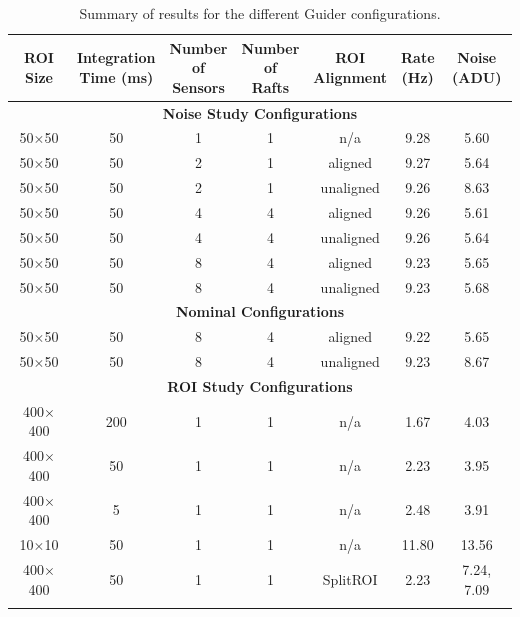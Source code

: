 \begin{longtable}[th]{|c|c|c|c|c|c|c|}
\caption{Summary of results for the different Guider configurations.}\\
\hline
\makecell{\textbf{ROI} \\ \textbf{Size}} &
\makecell{\textbf{Integration} \\ \textbf{Time (ms)}} &
\makecell{\textbf{Number} \\ \textbf{of} \\ \textbf{Sensors}} &
\makecell{\textbf{Number} \\ \textbf{of} \\ \textbf{Rafts}} &
\makecell{\textbf{ROI} \\ \textbf{Alignment}} &
\makecell{\textbf{Rate} \\ \textbf{(Hz)}} &
\makecell{\textbf{Noise} \\ \textbf{(ADU)}} \\
\hline
\hline
\endhead
\multicolumn{7}{|c|}{\textbf{Noise Study Configurations}} \\
\hline
50$\times$50   & 50  & 1 & 1 & n/a       &  9.28 & 5.60 \\ %
50$\times$50   & 50  & 2 & 1 & aligned   &  9.27 & 5.64 \\ %
50$\times$50   & 50  & 2 & 1 & unaligned &  9.26 & 8.63 \\ %
50$\times$50   & 50  & 4 & 4 & aligned   &  9.26 & 5.61 \\ %
50$\times$50   & 50  & 4 & 4 & unaligned &  9.26 & 5.64 \\ %
50$\times$50   & 50  & 8 & 4 & aligned   &  9.23 & 5.65 \\ %
50$\times$50   & 50  & 8 & 4 & unaligned &  9.23 & 5.68 \\ %
\hline
\multicolumn{7}{|c|}{\textbf{Nominal Configurations}} \\
\hline
50$\times$50   & 50  & 8 & 4 & aligned   &  9.22 & 5.65 \\ %
50$\times$50   & 50  & 8 & 4 & unaligned &  9.23 & 8.67 \\ %
\hline
\multicolumn{7}{|c|}{\textbf{ROI Study Configurations}} \\
\hline
400$\times$400 & 200 & 1 & 1 & n/a       &  1.67 & 4.03 \\ %
400$\times$400 &  50 & 1 & 1 & n/a       &  2.23 & 3.95 \\ %
400$\times$400 &   5 & 1 & 1 & n/a       &  2.48 & 3.91 \\ %
10$\times$10   &  50 & 1 & 1 & n/a       & 11.80 & 13.56 \\ %
400$\times$400 &  50 & 1 & 1 & SplitROI  &  2.23 & 7.24, 7.09 \\ %
\hline
\label{tab:gds_configs}
\end{longtable}

